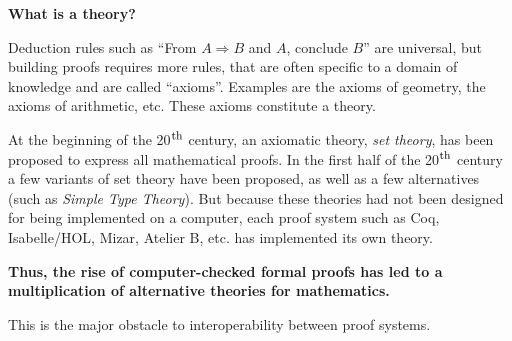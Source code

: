 \begin{framed}
\vspace*{-0.5cm}
  \begin{center}
{\bf \Large What is a theory?}
\end{center}

Deduction rules such as ``From $A \Rightarrow B$ and $A$, conclude
$B$'' are universal, but building proofs requires more rules, that are
often specific to a domain of knowledge and are called
``axioms''. Examples are the axioms of geometry, the axioms of
arithmetic, etc. These axioms constitute a theory.

At the beginning of the 20$^{\mbox{\footnotesize th}}$ century, an
axiomatic theory, {\em set theory}, has been proposed to express all
mathematical proofs. In the first half of the 20$^{\mbox{\footnotesize
    th}}$ century a few variants of set theory have been proposed, as
well as a few alternatives (such as \emph{Simple Type Theory}).  But
because these theories had not been designed for being implemented on
a computer, each proof system such as Coq, Isabelle/HOL, Mizar,
Atelier B, etc. has implemented its own theory.  {\bf Thus, the rise of
computer-checked formal proofs has led to a multiplication of
alternative theories for mathematics.

This is the major obstacle to interoperability between proof systems.}
\end{framed}

